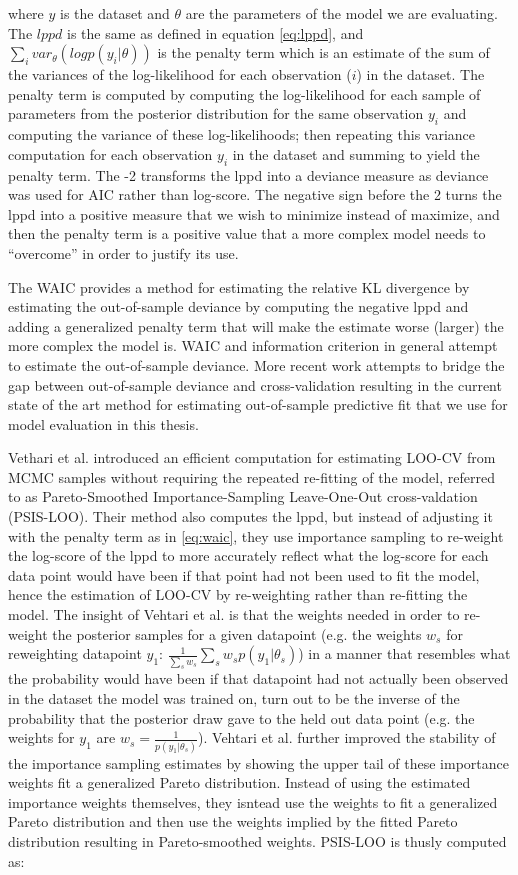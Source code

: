 where $y$ is the dataset and $\theta$ are the parameters of the model we are evaluating. The $lppd$ is the same as defined in equation \ref{eq:lppd}, and $\sum_i var_{\theta}(logp(y_i|\theta))$ is the penalty term which is an estimate of the sum of the variances of the log-likelihood for each observation ($i$) in the dataset. The penalty term is computed by computing the log-likelihood for each sample of parameters from the posterior distribution for the same observation $y_i$ and computing the variance of these log-likelihoods; then repeating this variance computation for each observation $y_i$ in the dataset and summing to yield the penalty term. The -2 transforms the lppd into a deviance measure as deviance was used for AIC rather than log-score. The negative sign before the 2 turns the lppd into a positive measure that we wish to minimize instead of maximize, and then the penalty term is a positive value that a more complex model needs to ``overcome'' in order to justify its use.

The WAIC provides a method for estimating the relative KL divergence by estimating the out-of-sample deviance by computing the negative lppd and adding a generalized penalty term that will make the estimate worse (larger) the more complex the model is. WAIC and information criterion in general attempt to estimate the out-of-sample deviance. More recent work attempts to bridge the gap between out-of-sample deviance and cross-validation resulting in the current state of the art method for estimating out-of-sample predictive fit that we use for model evaluation in this thesis.

Vethari et al. \cite{Vehtari2016} introduced an efficient computation for estimating LOO-CV from MCMC samples without requiring the repeated re-fitting of the model, referred to as Pareto-Smoothed Importance-Sampling Leave-One-Out cross-valdation (PSIS-LOO). Their method also computes the lppd, but instead of adjusting it with the penalty term as in \ref{eq:waic}, they use importance sampling to re-weight the log-score of the lppd to more accurately reflect what the log-score for each data point would have been if that point had not been used to fit the model, hence the estimation of LOO-CV by re-weighting rather than re-fitting the model. The insight of Vehtari et al. is that the weights needed in order to re-weight the posterior samples for a given datapoint (e.g. the weights $w_s$ for reweighting datapoint $y_1$: $\frac{1}{\sum_s w_s} \sum_s w_s p(y_1 | \theta_s)$) in a manner that resembles what the probability would have been if that datapoint had not actually been observed in the dataset the model was trained on, turn out to be the inverse of the probability that the posterior draw gave to the held out data point (e.g. the weights for $y_1$ are $w_s = \frac{1}{p(y_1|\theta_s)}$). Vehtari et al. further improved the stability of the importance sampling estimates by showing the upper tail of these importance weights fit a generalized Pareto distribution. Instead of using the estimated importance weights themselves, they isntead use the weights to fit a generalized Pareto distribution and then use the weights implied by the fitted Pareto distribution resulting in Pareto-smoothed weights. PSIS-LOO is thusly computed as:

